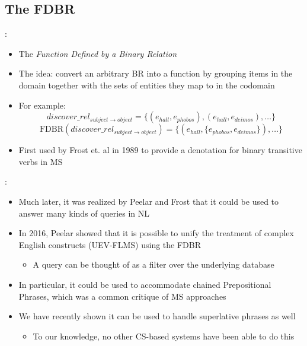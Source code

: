 \documentclass[logoontitle,tabu,supertabular,aspectratio=43]{preney-uwindsor-beamer}
\newcommand{\entityassoc}[1]{e_{#1}}
\newcommand{\FDBR}[1]{\mathrm{FDBR}({#1})}
\newcommand{\relationn}[3]{\mathit{#1\_rel_{#2 \rightarrow #3}}}
\begin{document}
	\subsection{The FDBR}
	\begin{frame}{\insertsection: \insertsubsection}
		\begin{itemize}
			\item The {\em Function Defined by a Binary Relation}
			\item The idea: convert an arbitrary BR into a function by grouping items in the domain together with the sets of entities they map to in the codomain
			\item For example:
			\begin{equation*}
			\relationn{discover}{subject}{object} = \{(\entityassoc{hall}, \entityassoc{phobos}),(\entityassoc{hall},\entityassoc{deimos}),\ldots\}
			\end{equation*}
			\begin{equation*}
			\FDBR{\relationn{discover}{subject}{object}} = \big\{(\entityassoc{hall}, \{\entityassoc{phobos}, \entityassoc{deimos}\}), \ldots\big\}
			\end{equation*}
			\item First used by Frost et. al in 1989 \cite{frost1989constructing} to provide a denotation for binary transitive verbs in MS
		\end{itemize}
	\end{frame}

	\begin{frame}{\insertsection: \insertsubsection}
		\begin{itemize}
			\item Much later, it was realized by Peelar and Frost that it could be used to answer many kinds of queries in NL
			\item In 2016, Peelar showed that it is possible to unify the treatment of complex English constructs (UEV-FLMS) using the FDBR \cite{peelar2016accommodating}
			\begin{itemize}
				\item A query can be thought of as a filter over the underlying database
			\end{itemize}
			\item In particular, it could be used to accommodate chained Prepositional Phrases, which was a common critique of MS approaches
			\item We have recently shown it can be used to handle superlative phrases as well
			\begin{itemize}
				\item To our knowledge, no other CS-based systems have been able to do this
			\end{itemize}
		\end{itemize}
	\end{frame}
\end{document}
